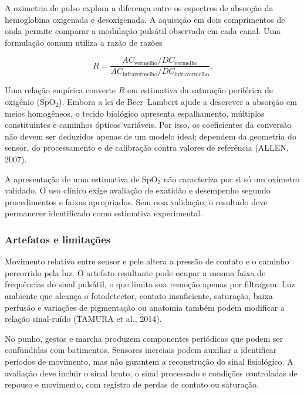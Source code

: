 \documentclass{article}
\begin{document}
A oximetria de pulso explora a diferen\c{c}a entre os espectros de absor\c{c}\~ao da hemoglobina oxigenada e desoxigenada. A aquisi\c{c}\~ao em dois comprimentos de onda permite comparar a modula\c{c}\~ao puls\'atil observada em cada canal. Uma formula\c{c}\~ao comum utiliza a raz\~ao de raz\~oes


\[
R=\frac{AC_{\mathrm{vermelho}}/DC_{\mathrm{vermelho}}}
        {AC_{\mathrm{infravermelho}}/DC_{\mathrm{infravermelho}}}.
\]


Uma rela\c{c}\~ao emp\'irica converte \(R\) em estimativa da satura\c{c}\~ao perif\'erica de oxig\^enio (SpO$_2$). Embora a lei de Beer--Lambert ajude a descrever a absor\c{c}\~ao em meios homog\^eneos, o tecido biol\'ogico apresenta espalhamento, m\'ultiplos constituintes e caminhos \'opticos vari\'aveis. Por isso, os coeficientes da convers\~ao n\~ao devem ser deduzidos apenas de um modelo ideal; dependem da geometria do sensor, do processamento e de calibra\c{c}\~ao contra valores de refer\^encia (ALLEN, 2007).


A apresenta\c{c}\~ao de uma estimativa de SpO$_2$ n\~ao caracteriza por si s\'o um ox\'imetro validado. O uso cl\'inico exige avalia\c{c}\~ao de exatid\~ao e desempenho segundo procedimentos e faixas apropriados. Sem essa valida\c{c}\~ao, o resultado deve permanecer identificado como estimativa experimental.


\subsubsection{Artefatos e limita\c{c}\~oes}


Movimento relativo entre sensor e pele altera a press\~ao de contato e o caminho percorrido pela luz. O artefato resultante pode ocupar a mesma faixa de frequ\^encias do sinal puls\'atil, o que limita sua remo\c{c}\~ao apenas por filtragem. Luz ambiente que alcan\c{c}a o fotodetector, contato insuficiente, satura\c{c}\~ao, baixa perfus\~ao e varia\c{c}\~oes de pigmenta\c{c}\~ao ou anatomia tamb\'em podem modificar a rela\c{c}\~ao sinal-ru\'ido (TAMURA et al., 2014).


No punho, gestos e marcha produzem componentes peri\'odicas que podem ser confundidas com batimentos. Sensores inerciais podem auxiliar a identificar per\'iodos de movimento, mas n\~ao garantem a reconstru\c{c}\~ao do sinal fisiol\'ogico. A avalia\c{c}\~ao deve incluir o sinal bruto, o sinal processado e condi\c{c}\~oes controladas de repouso e movimento, com registro de perdas de contato ou satura\c{c}\~ao.
\end{document}

